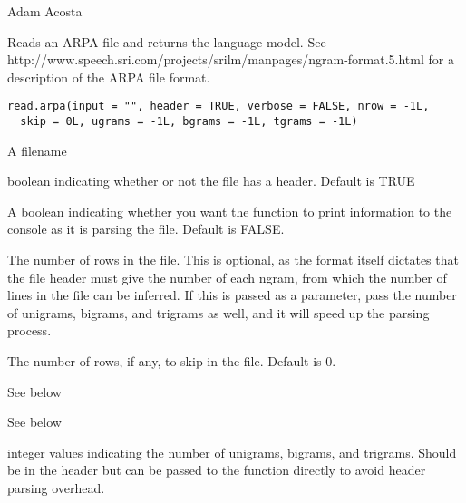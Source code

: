 \documentclass[letterpaper]{book}
\begin{document}
%
\begin{Author}\relax
Adam Acosta
\end{Author}
%
\begin{Description}\relax
Reads an ARPA file and returns the language model. See
http://www.speech.sri.com/projects/srilm/manpages/ngram-format.5.html
for a description of the ARPA file format.
\end{Description}
%
\begin{Usage}
\begin{verbatim}
read.arpa(input = "", header = TRUE, verbose = FALSE, nrow = -1L,
  skip = 0L, ugrams = -1L, bgrams = -1L, tgrams = -1L)
\end{verbatim}
\end{Usage}
%
\begin{Arguments}
\begin{ldescription}
\item[\code{input}] A filename

\item[\code{header}] boolean indicating whether or not the file has a header.
Default is TRUE

\item[\code{verbose}] A boolean indicating whether you want the function to
print information to the console as it is parsing the file. Default is FALSE.

\item[\code{nrow}] The number of rows in the file. This is optional, as the format
itself dictates that the file header must give the number of each ngram,
from which the number of lines in the file can be inferred. If this is passed
as a parameter, pass the number of unigrams, bigrams, and trigrams as well,
and it will speed up the parsing process.

\item[\code{skip}] The number of rows, if any, to skip in the file. Default is 0.

\item[\code{ugrams}] See below

\item[\code{bgrams}] See below

\item[\code{tgrams}] integer values indicating the number of unigrams, bigrams,
and trigrams. Should be in the header but can be passed to the function
directly to avoid header parsing overhead.
\end{ldescription}
\end{Arguments}
\end{document}
